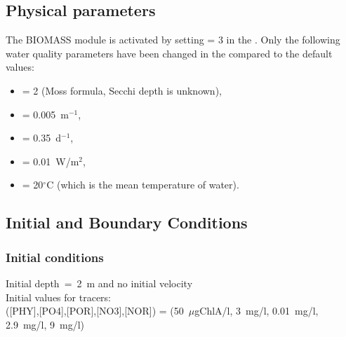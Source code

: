 \subsection{Physical parameters}
%
The BIOMASS module is activated by setting  = 3
in the  .
%
Only the following water quality parameters have been changed
in the \waqtel {} compared to the default values:
\begin{itemize}
\item {} = 2 (Moss formula, Secchi depth is unknown),
\item {} = 0.005~m$^{-1}$,
\item {} = 0.35~d$^{-1}$,
\item {} = 0.01~W/m$^2$,
\item {} = 20$^\circ$C (which is the mean temperature of water).
\end{itemize}
%
%
%
%
%
%
\subsection{Initial and Boundary Conditions}
%
\subsubsection{Initial conditions}
%
Initial depth~=~2~m
and no initial velocity\\
Initial values for tracers:\\
([PHY],[PO4],[POR],[NO3],[NOR]) =
(50~$\mu$gChlA/l, 3~mg/l, 0.01~mg/l, 2.9~mg/l, 9~mg/l)
%
